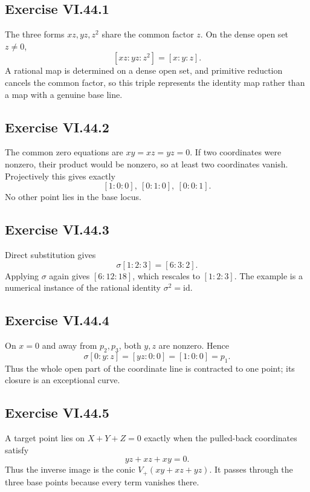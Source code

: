 \subsection*{Exercise VI.44.1}
\begin{solution}
The three forms \(xz,yz,z^2\) share the common factor \(z\).  On the dense open set \(z\neq0\),
\[
[xz:yz:z^2]=[x:y:z].
\]
A rational map is determined on a dense open set, and primitive reduction cancels the common factor, so this triple represents the identity map rather than a map with a genuine base line.
\end{solution}

\subsection*{Exercise VI.44.2}
\begin{solution}
The common zero equations are \(xy=xz=yz=0\).  If two coordinates were nonzero, their product would be nonzero, so at least two coordinates vanish.  Projectively this gives exactly
\[
[1:0:0],\ [0:1:0],\ [0:0:1].
\]
No other point lies in the base locus.
\end{solution}

\subsection*{Exercise VI.44.3}
\begin{solution}
Direct substitution gives
\[
\sigma[1:2:3]=[6:3:2].
\]
Applying \(\sigma\) again gives \([6:12:18]\), which rescales to \([1:2:3]\).  The example is a numerical instance of the rational identity \(\sigma^2=\mathrm{id}\).
\end{solution}

\subsection*{Exercise VI.44.4}
\begin{solution}
On \(x=0\) and away from \(p_2,p_3\), both \(y,z\) are nonzero.  Hence
\[
\sigma[0:y:z]=[yz:0:0]=[1:0:0]=p_1.
\]
Thus the whole open part of the coordinate line is contracted to one point; its closure is an exceptional curve.
\end{solution}

\subsection*{Exercise VI.44.5}
\begin{solution}
A target point lies on \(X+Y+Z=0\) exactly when the pulled-back coordinates satisfy
\[
yz+xz+xy=0.
\]
Thus the inverse image is the conic \(V_+(xy+xz+yz)\).  It passes through the three base points because every term vanishes there.
\end{solution}

